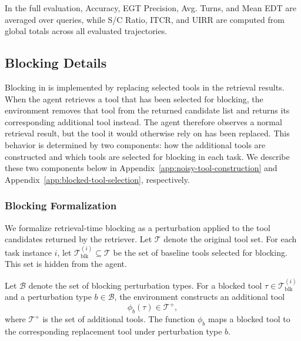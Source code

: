 In the full evaluation, Accuracy, EGT Precision, Avg. Turns, and Mean EDT are averaged over queries, while S/C Ratio, ITCR, and UIRR are computed from global totals across all evaluated trajectories.

\subsection{Blocking Details}
\label{app:blocker-details}


Blocking in \bench{} is implemented by replacing selected tools in the retrieval results. 
When the agent retrieves a tool that has been selected for blocking, the environment removes that tool from the returned candidate list and returns its corresponding additional tool instead. 
The agent therefore observes a normal retrieval result, but the tool it would otherwise rely on has been replaced. 
This behavior is determined by two components: how the additional tools are constructed and which tools are selected for blocking in each task. 
We describe these two components below in Appendix~\ref{app:noisy-tool-construction} and Appendix~\ref{app:blocked-tool-selection}, respectively.

\subsubsection{Blocking Formalization}
\label{app:blocking-formalization}


We formalize retrieval-time blocking as a perturbation applied to the tool candidates returned by the retriever. 
Let $\mathcal{T}$ denote the original tool set. 
For each task instance $i$, let $\mathcal{T}^{(i)}_{\mathrm{blk}} \subseteq \mathcal{T}$ be the set of baseline tools selected for blocking. 
This set is hidden from the agent.

Let $\mathcal{B}$ denote the set of blocking perturbation types. 
For a blocked tool $\tau \in \mathcal{T}^{(i)}_{\mathrm{blk}}$ and a perturbation type $b \in \mathcal{B}$, the environment constructs an additional tool
\begin{equation}
\phi_b(\tau) \in \mathcal{T}^{+},
\end{equation}
where $\mathcal{T}^{+}$ is the set of additional tools. 
The function $\phi_b$ maps a blocked tool to the corresponding replacement tool under perturbation type $b$.

